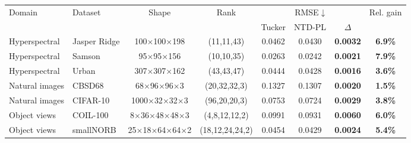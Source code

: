 \begin{tabular}{@{}l l c c c c c c@{}}
\toprule
\multirow{2}{*}{Domain} & \multirow{2}{*}{Dataset} & \multirow{2}{*}{Shape} & \multirow{2}{*}{Rank} & \multicolumn{3}{c}{RMSE$\downarrow$} & \multirow{2}{*}{Rel. gain} \\
\cmidrule(lr){5-7}
& & & & Tucker & NTD-PL & $\Delta$ & \\
\midrule
Hyperspectral & Jasper Ridge & 100$\times$100$\times$198 & (11,11,43) & 0.0462 & 0.0430 & \textbf{0.0032} & \textbf{6.9\%} \\
Hyperspectral & Samson & 95$\times$95$\times$156 & (10,10,35) & 0.0263 & 0.0242 & \textbf{0.0021} & \textbf{7.9\%} \\
Hyperspectral & Urban & 307$\times$307$\times$162 & (43,43,47) & 0.0444 & 0.0428 & \textbf{0.0016} & \textbf{3.6\%} \\
\midrule
Natural images & CBSD68 & 68$\times$96$\times$96$\times$3 & (20,32,32,3) & 0.1327 & 0.1307 & \textbf{0.0020} & \textbf{1.5\%} \\
Natural images & CIFAR-10 & 1000$\times$32$\times$32$\times$3 & (96,20,20,3) & 0.0753 & 0.0724 & \textbf{0.0029} & \textbf{3.8\%} \\
\midrule
Object views & COIL-100 & 8$\times$36$\times$48$\times$48$\times$3 & (4,8,12,12,2) & 0.0991 & 0.0931 & \textbf{0.0060} & \textbf{6.0\%} \\
Object views & smallNORB & 25$\times$18$\times$64$\times$64$\times$2 & (18,12,24,24,2) & 0.0454 & 0.0429 & \textbf{0.0024} & \textbf{5.4\%} \\
\bottomrule
\end{tabular}
